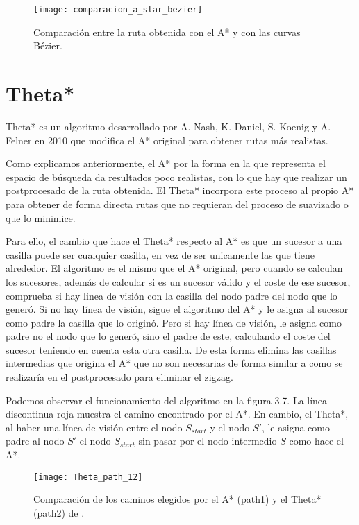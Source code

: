 \begin{figure}[!htpb]
    \centering
    \texttt{[image: comparacion\_a\_star\_bezier]}
    \caption[Comparativa de rutas con A* y con curvas Bézier]{Comparación entre la ruta obtenida con el A* y con las curvas Bézier.}
    \label{fig:basics AFM sketch}
\end{figure}

\newpage

\section{Theta*} \label{referenciaTheta}
Theta* es un algoritmo desarrollado por A. Nash, K. Daniel, S. Koenig y A. Felner \cite{thetaestrella, thetaestrellaweb} en 2010 que modifica el A* original para obtener rutas más realistas.

Como explicamos anteriormente, el A* por la forma en la que representa el espacio de búsqueda da resultados poco realistas, con lo que hay que realizar un postprocesado de la ruta obtenida. El Theta* incorpora este proceso al propio A* para obtener de forma directa rutas que no requieran del proceso de suavizado o que lo minimice.

Para ello, el cambio que hace el Theta* respecto al A* es que un sucesor a una casilla puede ser cualquier casilla, en vez de ser unicamente las que tiene alrededor. El algoritmo es el mismo que el A* original, pero cuando se calculan los sucesores, además de calcular si es un sucesor válido y el coste de ese sucesor, comprueba si hay linea de visión con la casilla del nodo padre del nodo que lo generó. Si no hay línea de visión, sigue el algoritmo del A* y le asigna al sucesor como padre la casilla que lo originó. Pero si hay línea de visión, le asigna como padre no el nodo que lo generó, sino el padre de este, calculando el coste del sucesor teniendo en cuenta esta otra casilla. De esta forma elimina las casillas intermedias que origina el A* que no son necesarias de forma similar a como se realizaría en el postprocesado para eliminar el zigzag.

Podemos observar el funcionamiento del algoritmo en la figura 3.7. La línea discontinua roja muestra el camino encontrado por el A*. En cambio, el Theta*, al haber una línea de visión entre el nodo $S_{start}$ y el nodo $S'$, le asigna como padre al nodo $S'$ el nodo $S_{start}$ sin pasar por el nodo intermedio $S$ como hace el A*.

\begin{figure}[htpb]
    \centering
    \texttt{[image: Theta\_path\_12]}
    \caption[Comparación de los caminos elegidos por el A* y el Theta*]{Comparación de los caminos elegidos por el A* (path1) y el Theta* (path2) de \cite{thetaestrellawebimagen}.}
    \label{fig:basics AFM sketch}
\end{figure}


